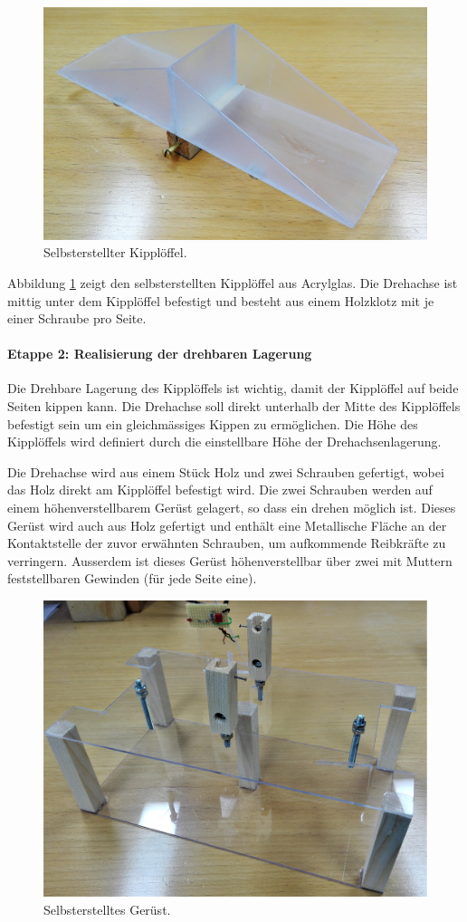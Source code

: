 \begin{figure}[h]
\centering
\includegraphics[width=0.8\linewidth]{graphics/Etappe1.jpg}
\caption{Selbsterstellter Kipplöffel.}
\label{fig:Etappe1}
\end{figure}

Abbildung \ref{fig:Etappe1} zeigt den selbsterstellten Kipplöffel aus Acrylglas. Die Drehachse ist mittig unter dem Kipplöffel befestigt und besteht aus einem Holzklotz mit je einer Schraube pro Seite.

\paragraph{\textbf{Etappe 2: Realisierung der drehbaren Lagerung}}
Die Drehbare Lagerung des Kipplöffels ist wichtig, damit der Kipplöffel auf beide Seiten kippen kann. Die Drehachse soll direkt unterhalb der Mitte des Kipplöffels befestigt sein um ein gleichmässiges Kippen zu ermöglichen. Die Höhe des Kipplöffels wird definiert durch die einstellbare Höhe der Drehachsenlagerung. 

Die Drehachse wird aus einem Stück Holz und zwei Schrauben gefertigt, wobei das Holz direkt am Kipplöffel befestigt wird. Die zwei Schrauben werden auf einem höhenverstellbarem Gerüst gelagert, so dass ein drehen möglich ist. Dieses Gerüst wird auch aus Holz gefertigt und enthält eine Metallische Fläche an der Kontaktstelle der zuvor erwähnten Schrauben, um aufkommende Reibkräfte zu verringern. Ausserdem ist dieses Gerüst höhenverstellbar über zwei mit Muttern feststellbaren Gewinden (für jede Seite eine). 

\begin{figure}[h]
\centering
\includegraphics[width=0.8\linewidth]{graphics/Etappe2.jpg}
\caption{Selbsterstelltes Gerüst.}
\label{fig:Etappe2}
\end{figure}

